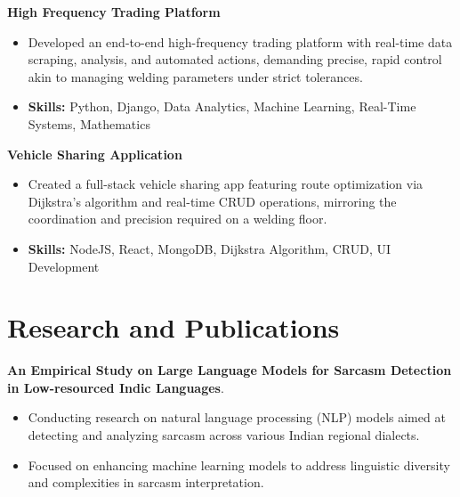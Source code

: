 \documentclass[a4paper,11pt]{article}
\begin{document}
\vspace{1mm}
  \textbf{High Frequency Trading Platform  }
\vspace{-1.5mm} %
\begin{itemize}
  \item Developed an end-to-end high-frequency trading platform with real-time data scraping, analysis, and automated actions, demanding precise, rapid control akin to managing welding parameters under strict tolerances.
\vspace{-3mm}
  \item \textbf{Skills:} Python, Django, Data Analytics, Machine Learning, Real-Time Systems, Mathematics
\end{itemize}


\vspace{1mm}
   \textbf{Vehicle Sharing Application }
\vspace{-1.5mm} %
\begin{itemize}
  \item Created a full-stack vehicle sharing app featuring route optimization via Dijkstra's algorithm and real-time CRUD operations, mirroring the coordination and precision required on a welding floor.
\vspace{-3mm}
  \item \textbf{Skills:} NodeJS, React, MongoDB, Dijkstra Algorithm, CRUD, UI Development
\end{itemize}



\section{\textbf{Research and Publications} \hfill }
\vspace{1mm}
  \textbf{An Empirical Study on Large Language Models for Sarcasm Detection in Low-resourced Indic Languages}.
\vspace{-1mm} %
\begin{itemize}
  \item Conducting research on natural language processing (NLP) models aimed at detecting and analyzing sarcasm across various Indian regional dialects.
\vspace{-3mm}
  \item Focused on enhancing machine learning models to address linguistic diversity and complexities in sarcasm interpretation.
\end{itemize}
\end{document}
